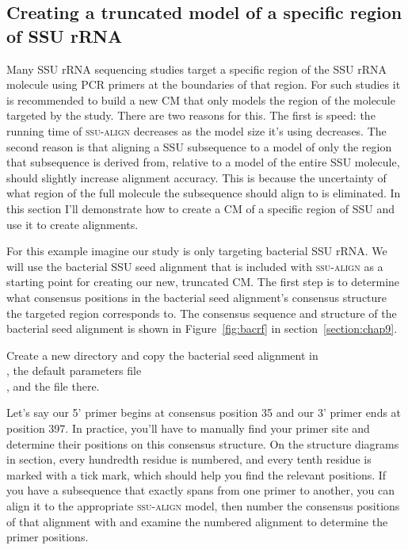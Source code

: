 \subsection{Creating a truncated model of a specific region of SSU rRNA}

Many SSU rRNA sequencing studies target a specific region of the SSU
rRNA molecule using PCR primers at the boundaries of that region. For
such studies it is recommended to build a new CM that only models the
region of the molecule targeted by the study. There are two reasons
for this. The first is speed: the running time of \textsc{ssu-align}
decreases as the model size it's using decreases. The second reason is
that aligning a SSU subsequence to a model of only the region that
subsequence is derived from, relative to a model of the entire SSU
molecule, should slightly increase alignment accuracy. This is because
the uncertainty of what region of the full molecule the subsequence
should align to is eliminated. In this section I'll demonstrate how to
create a CM of a specific region of SSU and use it to create
alignments. 

For this example imagine our study is only targeting bacterial SSU
rRNA. We will use the bacterial SSU seed alignment that is included
with \textsc{ssu-align} as a starting point for creating our new,
truncated CM. The first step is to determine what consensus positions
in the bacterial seed alignment's consensus structure the targeted
region corresponds to. The consensus sequence and structure of the
bacterial seed alignment is shown in Figure~\ref{fig:bacrf} in
section~\ref{section:chap9}.


Create a new directory and copy the bacterial seed alignment in \\
, the default parameters
file \\ , and the file
 there.

Let's say our 5' primer begins at consensus position 35 and our 3'
primer ends at position 397.  In practice, you'll have to manually
find your primer site and determine their positions on this consensus
structure. On the structure diagrams in section, every
hundredth residue is numbered, and every tenth residue is marked with
a tick mark, which should help you find the relevant positions.  If
you have a subsequence that exactly spans from one primer to another,
you can align it to the appropriate \textsc{ssu-align} model, then
number the consensus positions of that alignment with
 and examine the numbered alignment to
determine the primer positions.

